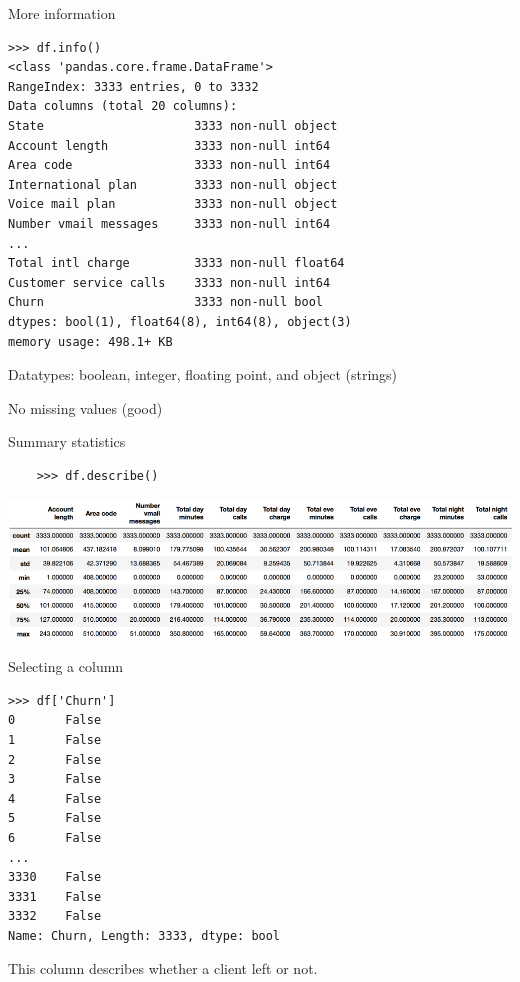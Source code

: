 \documentclass[aspectratio=169,usenames,dvipsnames]{beamer}
\begin{document}
\begin{frame}[fragile]{More information}
\begin{lstlisting}
>>> df.info()
<class 'pandas.core.frame.DataFrame'>
RangeIndex: 3333 entries, 0 to 3332
Data columns (total 20 columns):
State                     3333 non-null object
Account length            3333 non-null int64
Area code                 3333 non-null int64
International plan        3333 non-null object
Voice mail plan           3333 non-null object
Number vmail messages     3333 non-null int64
...
Total intl charge         3333 non-null float64
Customer service calls    3333 non-null int64
Churn                     3333 non-null bool
dtypes: bool(1), float64(8), int64(8), object(3)
memory usage: 498.1+ KB
\end{lstlisting}

Datatypes: boolean, integer, floating point, and object (strings)

No missing values (good)
\end{frame}

\begin{frame}[fragile]{Summary statistics}
    \begin{lstlisting}
    >>> df.describe()
    \end{lstlisting}

    \includegraphics[height=0.5\textheight]{fig/telecomdescribe}
\end{frame}

\begin{frame}[fragile]{Selecting a column}
\begin{lstlisting}
>>> df['Churn']
0       False
1       False
2       False
3       False
4       False
5       False
6       False
...
3330    False
3331    False
3332    False
Name: Churn, Length: 3333, dtype: bool
\end{lstlisting}

This column describes whether a client left or not.
\end{frame}
\end{document}
